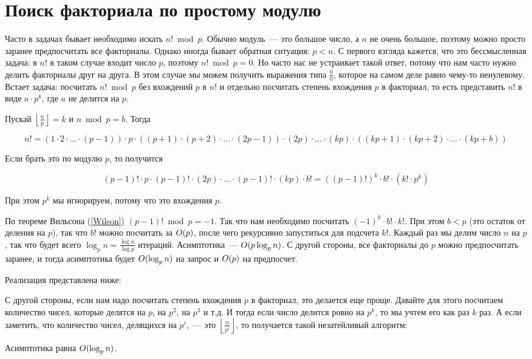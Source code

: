 \chapter{Поиск факториала по простому модулю}

Часто в задачах бывает необходимо искать $n! \bmod p$. Обычно модуль~--- это большое число, а $n$ не очень большое, поэтому можно просто заранее предпосчитать все факториалы. Однако иногда бывает обратная ситуация: $p < n$. С первого взгляда кажется, что это бессмысленная задача: в $n!$ в таком случае входит число $p$, поэтому $n! \bmod p = 0$. Но часто нас не устраивает такой ответ, потому что нам часто нужно делить факториалы друг на друга. В этом случае мы можем получить выражения типа $\frac{0}{0}$, которое на самом деле равно чему-то ненулевому. Встает задача: посчитать $n! \bmod p$ без вхождений $p$ в $n!$ и отдельно посчитать степень вхождения $p$ в факториал, то есть представить $n!$ в виде $a \cdot p^k$, где $a$ не делится на $p$.

Пускай $\left\lfloor \frac{n}{p} \right\rfloor = k$ и $n \bmod p = b$. Тогда

$$n! = (1 \cdot 2 \cdot \ldots \cdot (p - 1)) \cdot p \cdot ((p + 1) \cdot (p + 2) \cdot \ldots \cdot (2p - 1)) \cdot (2p) \cdot \ldots \cdot (kp) \cdot ((kp + 1) \cdot (kp + 2) \cdot \ldots \cdot (kp + b))$$

Если брать это по модулю $p$, то получится

$$(p - 1)! \cdot p \cdot (p - 1)! \cdot (2p) \cdot \ldots \cdot (p - 1)! \cdot (kp) \cdot b! = \left((p - 1)!\right)^k \cdot b! \cdot (k! \cdot p^k)$$

При этом $p^k$ мы игнорируем, потому что это вхождения $p$.

По теореме Вильсона (\ref{Wilson}) $(p - 1)! \bmod p = -1$. Так что нам необходимо посчитать $(-1)^k \cdot b! \cdot k!$.
При этом $b < p$ (это остаток от деления на $p$), так что $b!$ можно посчитать за $O(p)$, после чего рекурсивно запуститься для подсчета $k!$. Каждый раз мы делим число $n$ на $p$, так что будет всего $\log_p n = \frac{\log n}{\log p}$ итераций. Асимптотика~--- $O(p \log_p n)$. С другой стороны, все факториалы до $p$ можно предпосчитать заранее, и тогда асимптотика будет $O(\log_p n)$ на запрос и $O(p)$ на предпосчет.

Реализация представлена ниже:



С другой стороны, если нам надо посчитать степень вхождения $p$ в факториал, это делается еще проще. Давайте для этого посчитаем количество чисел, которые делятся на $p$, на $p^2$, на $p^3$ и т.д. И тогда если число делится ровно на $p^k$, то мы учтем его как раз $k$ раз. А если заметить, что количество чисел, делящихся на $p^i$,~--- это $\left\lfloor \frac{n}{p^i} \right\rfloor$, то получается такой незатейливый алгоритм:



Асимптотика равна $O(\log_p n)$.
